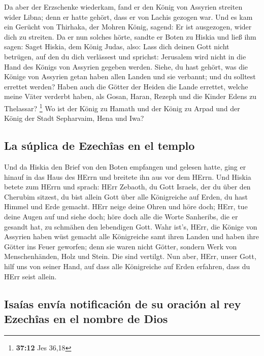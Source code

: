 Da aber der Erzschenke wiederkam, fand er den König von
Assyrien streiten wider Libna; denn er hatte gehört, dass er von Lachis
gezogen war.  Und es kam ein Gerücht von Thirhaka, der
Mohren König, sagend: Er ist ausgezogen, wider dich zu streiten.
 Da er nun solches hörte, sandte er Boten zu Hiskia und
ließ ihm sagen: Saget Hiskia, dem König Judas, also: Lass dich deinen
Gott nicht betrügen, auf den du dich verlässest und sprichst: Jerusalem
wird nicht in die Hand des Königs von Assyrien gegeben werden.
 Siehe, du hast gehört, was die Könige von Assyrien getan
haben allen Landen und sie verbannt; und du solltest errettet werden?
 Haben auch die Götter der Heiden die Lande errettet,
welche meine Väter verderbt haben, als Gosan, Haran, Rezeph und die
Kinder Edens zu Thelassar? \footnote{\textbf{37:12} Jes 36,18}
 Wo ist der König zu Hamath und der König zu Arpad und
der König der Stadt Sepharvaim, Hena und Iwa?

\hypertarget{la-suxfaplica-de-ezechuxeeas-en-el-templo}{%
\subsection{La súplica de Ezechîas en el
templo}\label{la-suxfaplica-de-ezechuxeeas-en-el-templo}}

 Und da Hiskia den Brief von den Boten empfangen und
gelesen hatte, ging er hinauf in das Haus des HErrn und breitete ihn aus
vor dem HErrn.  Und Hiskia betete zum HErrn und sprach:
 HErr Zebaoth, du Gott Israels, der du über den Cherubim
sitzest, du bist allein Gott über alle Königreiche auf Erden, du hast
Himmel und Erde gemacht.  HErr neige deine Ohren und höre
doch; HErr, tue deine Augen auf und siehe doch; höre doch alle die Worte
Sanheribs, die er gesandt hat, zu schmähen den lebendigen Gott.
 Wahr ist's, HErr, die Könige von Assyrien haben wüst
gemacht alle Königreiche samt ihren Landen  und haben
ihre Götter ins Feuer geworfen; denn sie waren nicht Götter, sondern
Werk von Menschenhänden, Holz und Stein. Die sind vertilgt.
 Nun aber, HErr, unser Gott, hilf uns von seiner Hand,
auf dass alle Königreiche auf Erden erfahren, dass du HErr seist allein.

\hypertarget{isauxedas-envuxeda-notificaciuxf3n-de-su-oraciuxf3n-al-rey-ezechuxeeas-en-el-nombre-de-dios}{%
\subsection{Isaías envía notificación de su oración al rey Ezechîas en
el nombre de
Dios}\label{isauxedas-envuxeda-notificaciuxf3n-de-su-oraciuxf3n-al-rey-ezechuxeeas-en-el-nombre-de-dios}}

